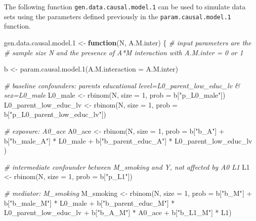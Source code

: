 \documentclass[
]{book}
\newenvironment{Shaded}{\begin{snugshade}}{\end{snugshade}}
\newcommand{\AttributeTok}[1]{\textcolor[rgb]{0.77,0.63,0.00}{#1}}
\newcommand{\CommentTok}[1]{\textcolor[rgb]{0.56,0.35,0.01}{\textit{#1}}}
\newcommand{\ControlFlowTok}[1]{\textcolor[rgb]{0.13,0.29,0.53}{\textbf{#1}}}
\newcommand{\DecValTok}[1]{\textcolor[rgb]{0.00,0.00,0.81}{#1}}
\newcommand{\FloatTok}[1]{\textcolor[rgb]{0.00,0.00,0.81}{#1}}
\newcommand{\FunctionTok}[1]{\textcolor[rgb]{0.00,0.00,0.00}{#1}}
\newcommand{\NormalTok}[1]{#1}
\newcommand{\OtherTok}[1]{\textcolor[rgb]{0.56,0.35,0.01}{#1}}
\newcommand{\SpecialCharTok}[1]{\textcolor[rgb]{0.00,0.00,0.00}{#1}}
\newcommand{\StringTok}[1]{\textcolor[rgb]{0.31,0.60,0.02}{#1}}
\begin{document}
The following function \texttt{gen.data.causal.model.1} can be used to simulate data sets using the parameters defined previously in the \texttt{param.causal.model.1} function.

\begin{Shaded}
\begin{Highlighting}[]
\NormalTok{gen.data.causal.model}\FloatTok{.1} \OtherTok{\textless{}{-}} \ControlFlowTok{function}\NormalTok{(N, A.M.inter) \{ }\CommentTok{\# input parameters are the }
  \CommentTok{\#   sample size N and the presence of A*M interaction with A.M.inter = 0 or 1}
  
\NormalTok{  b }\OtherTok{\textless{}{-}} \FunctionTok{param.causal.model.1}\NormalTok{(}\AttributeTok{A.M.interaction =}\NormalTok{ A.M.inter)}
    
  \CommentTok{\# baseline confounders: parent\textquotesingle{}s educational level=L0\_parent\_low\_educ\_lv \& sex=L0\_male}
\NormalTok{  L0\_male }\OtherTok{\textless{}{-}} \FunctionTok{rbinom}\NormalTok{(N, }\AttributeTok{size =} \DecValTok{1}\NormalTok{, }\AttributeTok{prob =}\NormalTok{ b[}\StringTok{"p\_L0\_male"}\NormalTok{]) }
\NormalTok{  L0\_parent\_low\_educ\_lv }\OtherTok{\textless{}{-}} \FunctionTok{rbinom}\NormalTok{(N, }\AttributeTok{size =} \DecValTok{1}\NormalTok{, }\AttributeTok{prob =}\NormalTok{ b[}\StringTok{"p\_L0\_parent\_low\_educ\_lv"}\NormalTok{])  }
  
  \CommentTok{\# exposure: A0\_ace}
\NormalTok{  A0\_ace }\OtherTok{\textless{}{-}} \FunctionTok{rbinom}\NormalTok{(N, }\AttributeTok{size =} \DecValTok{1}\NormalTok{, }\AttributeTok{prob =}\NormalTok{  b[}\StringTok{"b\_A"}\NormalTok{] }\SpecialCharTok{+} 
\NormalTok{                     b[}\StringTok{"b\_male\_A"}\NormalTok{] }\SpecialCharTok{*}\NormalTok{ L0\_male }\SpecialCharTok{+} 
\NormalTok{                     b[}\StringTok{"b\_parent\_educ\_A"}\NormalTok{] }\SpecialCharTok{*}\NormalTok{ L0\_parent\_low\_educ\_lv ) }
  
  \CommentTok{\# intermediate confounder between M\_smoking and Y, not affected by A0 L1}
\NormalTok{  L1 }\OtherTok{\textless{}{-}} \FunctionTok{rbinom}\NormalTok{(N, }\AttributeTok{size =} \DecValTok{1}\NormalTok{, }\AttributeTok{prob =}\NormalTok{ b[}\StringTok{"p\_L1"}\NormalTok{])}
  
  \CommentTok{\# mediator: M\_smoking}
\NormalTok{  M\_smoking }\OtherTok{\textless{}{-}} \FunctionTok{rbinom}\NormalTok{(N, }\AttributeTok{size =} \DecValTok{1}\NormalTok{, }\AttributeTok{prob =}\NormalTok{ b[}\StringTok{"b\_M"}\NormalTok{] }\SpecialCharTok{+} 
\NormalTok{                        b[}\StringTok{"b\_male\_M"}\NormalTok{] }\SpecialCharTok{*}\NormalTok{ L0\_male }\SpecialCharTok{+} 
\NormalTok{                        b[}\StringTok{"b\_parent\_educ\_M"}\NormalTok{] }\SpecialCharTok{*}\NormalTok{ L0\_parent\_low\_educ\_lv }\SpecialCharTok{+} 
\NormalTok{                        b[}\StringTok{"b\_A\_M"}\NormalTok{] }\SpecialCharTok{*}\NormalTok{ A0\_ace }\SpecialCharTok{+}
\NormalTok{                        b[}\StringTok{"b\_L1\_M"}\NormalTok{] }\SpecialCharTok{*}\NormalTok{ L1) }


\end{Highlighting}
\end{Shaded}
\end{document}
